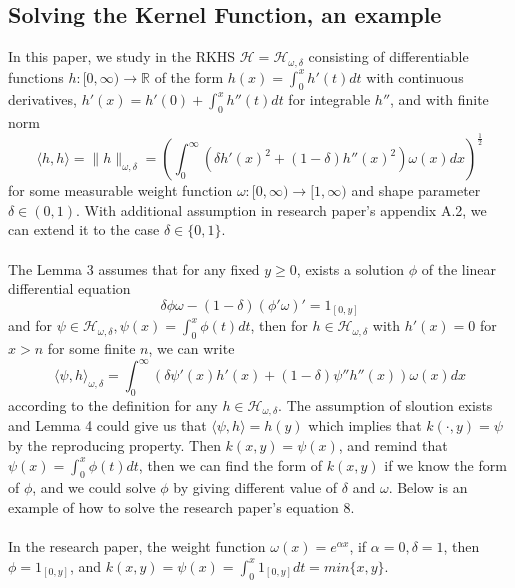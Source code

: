 
\subsection{Solving the Kernel Function, an example}
In this paper, we study in the RKHS $\mathcal{H} = \mathcal{H}_{\omega ,\delta}$ consisting of differentiable functions $ h : [0, \infty ) \to \mathbb{R}$ of the form $h(x) = \int_{0}^{x} h'(t) dt$ with continuous derivatives, $h'(x) = h'(0) + \int_{0}^{x} h''(t)dt $ for integrable $h''$, and with finite norm 
\begin{equation}
\langle h, h\rangle = \parallel h \parallel_{\omega ,\delta} = (\int_{0}^{\infty} (\delta h'(x)^2 + (1 - \delta)h''(x)^2)\omega (x)dx)^{\frac{1}{2}}
\end{equation}
for some measurable weight function $\omega : [0, \infty) \to [1, \infty)$ and shape parameter $\delta \in (0,1)$. With additional assumption in research paper's appendix A.2, we can extend it to the case $\delta \in \{ 0, 1\}$. 
\\ \\
The Lemma 3 assumes that for any fixed $y \ge 0$, exists a solution $\phi$ of the linear differential equation 
\begin{equation}
\delta \phi \omega - (1-\delta )(\phi ' \omega)' = 1_{[0,y]}
\end{equation}
and for $\psi  \in \mathcal{H}_{\omega, \delta}, \psi (x) = \int_{0}^{x} \phi (t)dt$, then for $h \in \mathcal{H}_{\omega, \delta}$ with $h'(x) = 0$ for $x > n$ for some finite $n$, we can write 
\begin{equation}
\langle \psi , h\rangle_{\omega, \delta} = \int_{0}^{\infty} (\delta \psi '(x) h'(x) + (1-\delta )\psi '' h''(x))\omega (x)dx
\end{equation}
according to the definition for any $h \in \mathcal{H}_{\omega,\delta}$. The assumption of sloution exists and Lemma 4 could give us that $\langle \psi , h\rangle = h(y)$ which implies that $k(\cdot , y) = \psi$ by the reproducing property. Then  $k(x , y) = \psi (x)$, and remind that $\psi (x) = \int_{0}^{x} \phi (t)dt$, then we can find the form of $k(x,y)$ if we know the form of $\phi$, and we could solve $\phi$ by giving different value of $\delta$ and $\omega$. Below is an example of how to solve the research paper's equation 8. 
\\ \\
In the research paper, the weight function $\omega (x) = e^{\alpha x}$, if $\alpha = 0, \delta = 1$, then $ \phi = 1_{[0,y]}$, and $k(x,y) = \psi (x) = \int_{0}^{x} 1_{[0,y]} dt = min\{x, y\}$. 
